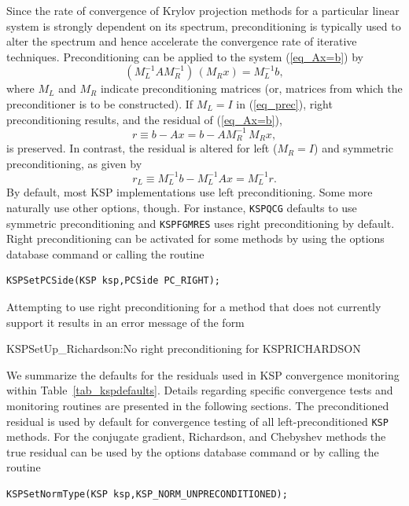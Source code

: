 Since the rate of convergence of Krylov projection methods for a
particular linear system is strongly dependent on its spectrum,
preconditioning is typically used to alter the spectrum and hence
accelerate the convergence rate of iterative techniques.
Preconditioning can be applied to the system (\ref{eq_Ax=b}) by
\begin{equation}
(M_L^{-1} A M_R^{-1}) \, (M_R x) = M_L^{-1} b,
\label{eq_prec}
\end{equation}
where $ M_L$ and $ M_R $ indicate preconditioning matrices (or, matrices
from which the preconditioner is to be constructed).  If $ M_L = I $
in (\ref{eq_prec}), right preconditioning results, and the
residual of (\ref{eq_Ax=b}),
  \[ r \equiv b - Ax = b - A M_R^{-1} \, M_R x, \]
is preserved.  In contrast, the residual is altered for left
($ M_R = I $) and symmetric preconditioning, as given by
  \[ r_L \equiv M_L^{-1} b - M_L^{-1} A x = M_L^{-1} r. \]
By default, most KSP implementations use left preconditioning.
Some more naturally use other options, though. For instance, \lstinline{KSPQCG} defaults to use symmetric preconditioning and \lstinline{KSPFGMRES} uses right preconditioning by default.
Right preconditioning can be activated for some methods by
using the options database command  or
calling the routine 
\begin{lstlisting}
KSPSetPCSide(KSP ksp,PCSide PC_RIGHT);
\end{lstlisting}
Attempting to use right preconditioning for a method that
does not currently support it results in an error message of the form
\begin{outputlisting}
KSPSetUp_Richardson:No right preconditioning for KSPRICHARDSON
\end{outputlisting}

We summarize the defaults for the residuals used in KSP convergence
monitoring within Table~\ref{tab_kspdefaults}.  Details regarding
specific convergence tests and monitoring routines are presented in
the following sections.  The preconditioned residual is used by
default for convergence testing of all left-preconditioned \lstinline{KSP}
methods. For the conjugate gradient, Richardson, and
Chebyshev methods the true residual can be used by
the options database command  or by calling the routine
\begin{lstlisting}
KSPSetNormType(KSP ksp,KSP_NORM_UNPRECONDITIONED);
\end{lstlisting}

